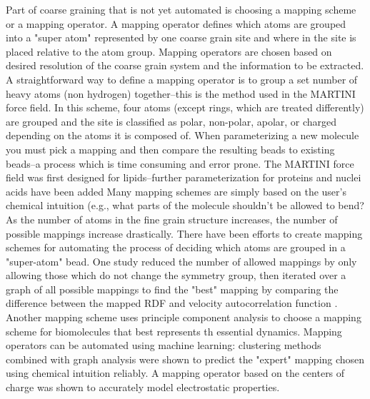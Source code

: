 Part of coarse graining that is not yet automated is choosing a mapping scheme or a mapping operator.
A mapping operator defines which atoms are grouped into a "super atom" represented by one coarse grain site and where in the site is placed relative to the atom group.
Mapping operators are chosen based on desired resolution of the coarse grain system and the information to be extracted.
A straightforward way to define a mapping operator is to group a set number of heavy atoms (non hydrogen) together--this is the method used in the MARTINI force field\cite{Marrink2007}.
In this scheme, four atoms (except rings, which are treated differently) are grouped and the site is classified as polar, non-polar, apolar, or charged depending on the atoms it is composed of.
When parameterizing a new molecule you must pick a mapping and then compare the resulting beads to existing beads--a process which is time consuming and error prone\cite{http://www.cgmartini.nl/index.php/tutorials-general-introduction-gmx5/parametrzining-new-molecule-gmx5}.
The MARTINI force field was first designed for lipids--further parameterization for proteins and nuclei acids have been added%
Many mapping schemes are simply based on the user's chemical intuition (e.g., what parts of the molecule shouldn't be allowed to bend?%
As the number of atoms in the fine grain structure increases, the number of possible mappings increase drastically.
There have been efforts to create mapping schemes for automating the process of deciding which atoms are grouped in a "super-atom" bead.
One study reduced the number of allowed mappings by only allowing those which do not change the symmetry group, then iterated over a graph of all possible mappings to find the "best" mapping by comparing the difference between the mapped RDF and velocity autocorrelation function \cite{Chakraborty2018a}.
Another mapping scheme uses principle component analysis to choose a mapping scheme for biomolecules that best represents th essential dynamics\cite{Zhang2008}.
Mapping operators can be automated using machine learning: clustering methods combined with graph analysis were shown to predict the "expert" mapping chosen using chemical intuition reliably\cite{Li2020}. 
A mapping operator based on the centers of charge was shown to accurately model electrostatic properties\cite{Cao2015a}.

